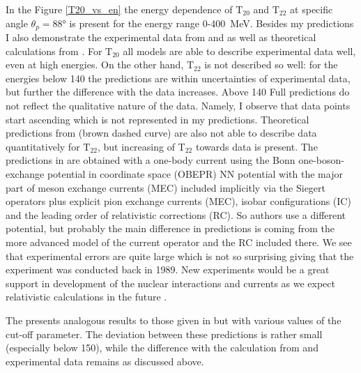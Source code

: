     In the Figure \ref{T20_vs_en} the energy dependence of $\text{T}_{20}$ and $\text{T}_{22}$
    at specific angle $\theta_p = \ang{88}$
    is present for the energy range 0-400~MeV. Besides my predictions I also demonstrate the experimental data from
    \cite{rachek2007} and \cite{mishev1993} as well as theoretical calculations from \cite{Schmitt1989}.
    For $\text{T}_{20}$ all models are able to describe experimental data well, even at
    high energies. On the other hand, $\text{T}_{22}$ is not described so well: for the 
    energies below \SI{140}{\mev} the predictions are within uncertainties of experimental data,
    but further the difference with the data increases. Above \SI{140}{\mev}
    Full predictions do not  
    reflect the qualitative nature of the data. Namely, I observe that
    data points start ascending which is not represented in my predictions.
    Theoretical predictions from \cite{Schmitt1989} (brown dashed curve) are also not able
    to describe data quantitatively for $\text{T}_{22}$, but increasing of T$_{22}$
    towards data is present. The predictions in \cite{Schmitt1989}
    are obtained with a one-body current using the Bonn one-boson-exchange potential
    in coordinate space (OBEPR)
    NN potential with the major part of meson exchange
    currents (MEC) included implicitly via the Siegert operators plus explicit
    pion exchange currents (MEC), isobar configurations
    (IC) and the leading order of relativistic corrections
    (RC). So authors use a different potential, but
    probably the main difference in predictions is coming from the
    more advanced model of the current operator
    and the RC included there.
    We see that experimental errors are quite large which is not so surprising
    giving that the experiment was conducted back in 1989.
    New experiments would be a great support in development of the nuclear interactions and currents
    as we expect relativistic calculations in the future \cite{Grassi2023}.

    The  presents analogous results to those given in  but
    with various values of the cut-off parameter. The deviation between these
    predictions is rather small (especially below \SI{150}{\mev}), while the
    difference with the calculation from \cite{Schmitt1989} and experimental 
    data remains as discussed above.

